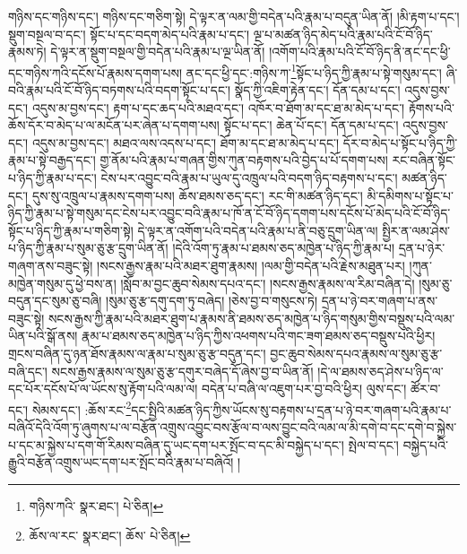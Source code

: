 གཉིས་དང་གཉིས་དང་། གཉིས་དང་གཅིག་སྟེ། དེ་ལྟར་ན་ལམ་གྱི་བདེན་པའི་རྣམ་པ་བདུན་ཡིན་ནོ། །མི་རྟག་པ་དང་། སྡུག་བསྔལ་བ་དང་། སྟོང་པ་དང་བདག་མེད་པའི་རྣམ་པ་དང་། ལྔ་པ་མཚན་ཉིད་མེད་པའི་རྣམ་པའི་ངོ་བོ་ཉིད་རྣམས་ཏེ། དེ་ལྟར་ན་སྡུག་བསྔལ་གྱི་བདེན་པའི་རྣམ་པ་ལྔ་ཡིན་ནོ། །འགོག་པའི་རྣམ་པའི་ངོ་བོ་ཉིད་ནི་ནང་དང་ཕྱི་དང་གཉིས་ཀའི་དངོས་པོ་རྣམས་དགག་པས། ནང་དང་ཕྱི་དང་:གཉིས་ཀ་\footnote{གཉིས་ཀའི་  སྣར་ཐང་།  པེ་ཅིན། }སྟོང་པ་ཉིད་ཀྱི་རྣམ་པ་སྟེ་གསུམ་དང་། ཞི་བའི་རྣམ་པའི་ངོ་བོ་ཉིད་བཏགས་པའི་བདག་སྟོང་པ་དང་། སྣོད་ཀྱི་འཇིག་རྟེན་དང་། དོན་དམ་པ་དང་། འདུས་བྱས་དང་། འདུས་མ་བྱས་དང་། རྟག་པ་དང་ཆད་པའི་མཐའ་དང་། འཁོར་བ་ཐོག་མ་དང་ཐ་མ་མེད་པ་དང་། རྟོགས་པའི་ཆོས་དོར་བ་མེད་པ་ལ་མངོན་པར་ཞེན་པ་དགག་པས། སྟོང་པ་དང་། ཆེན་པོ་དང་། དོན་དམ་པ་དང་། འདུས་བྱས་དང་། འདུས་མ་བྱས་དང་། མཐའ་ལས་འདས་པ་དང་། ཐོག་མ་དང་ཐ་མ་མེད་པ་དང་། དོར་བ་མེད་པ་སྟོང་པ་ཉིད་ཀྱི་རྣམ་པ་སྟེ་བརྒྱད་དང་། གྱ་ནོམ་པའི་རྣམ་པ་གཞན་གྱིས་ཀུན་བརྟགས་པའི་བྱེད་པ་པོ་དགག་པས། རང་བཞིན་སྟོང་པ་ཉིད་ཀྱི་རྣམ་པ་དང་། ངེས་པར་འབྱུང་བའི་རྣམ་པ་ཡུལ་དུ་འཁྲུལ་པའི་བདག་ཉིད་བརྟགས་པ་དང་། མཚན་ཉིད་དང་། དུས་སུ་འཁྲུལ་པ་རྣམས་དགག་པས། ཆོས་ཐམས་ཅད་དང་། རང་གི་མཚན་ཉིད་དང་། མི་དམིགས་པ་སྟོང་པ་ཉིད་ཀྱི་རྣམ་པ་སྟེ་གསུམ་དང་ངེས་པར་འབྱུང་བའི་རྣམ་པ་ཁོ་ན་ངོ་བོ་ཉིད་དགག་པས་དངོས་པོ་མེད་པའི་ངོ་བོ་ཉིད་སྟོང་པ་ཉིད་ཀྱི་རྣམ་པ་གཅིག་སྟེ། དེ་ལྟར་ན་འགོག་པའི་བདེན་པའི་རྣམ་པ་ནི་བཅུ་དྲུག་ཡིན་ལ། སྤྱིར་ན་ལམ་ཤེས་པ་ཉིད་ཀྱི་རྣམ་པ་སུམ་ཅུ་རྩ་དྲུག་ཡིན་ནོ། །དེའི་འོག་ཏུ་རྣམ་པ་ཐམས་ཅད་མཁྱེན་པ་ཉིད་ཀྱི་རྣམ་པ། དྲན་པ་ཉེར་གཞག་ནས་བཟུང་སྟེ། །སངས་རྒྱས་རྣམ་པའི་མཐར་ཐུག་རྣམས། །ལམ་གྱི་བདེན་པའི་རྗེས་མཐུན་པར། །ཀུན་མཁྱེན་གསུམ་དུ་ཕྱེ་བས་ན། །སློབ་མ་བྱང་ཆུབ་སེམས་དཔའ་དང་། །སངས་རྒྱས་རྣམས་ལ་རིམ་བཞིན་དེ། །སུམ་ཅུ་བདུན་དང་སུམ་ཅུ་བཞི། །སུམ་ཅུ་རྩ་དགུ་དག་ཏུ་བཞེད། །ཅེས་བྱ་བ་གསུངས་ཏེ། དྲན་པ་ཉེ་བར་གཞག་པ་ནས་བཟུང་སྟེ། སངས་རྒྱས་ཀྱི་རྣམ་པའི་མཐར་ཐུག་པ་རྣམས་ནི་ཐམས་ཅད་མཁྱེན་པ་ཉིད་གསུམ་གྱིས་བསྡུས་པའི་ལམ་ཡིན་པའི་སྒོ་ནས། རྣམ་པ་ཐམས་ཅད་མཁྱེན་པ་ཉིད་ཀྱིས་འཕགས་པའི་གང་ཟག་ཐམས་ཅད་བསྡུས་པའི་ཕྱིར། གྲངས་བཞིན་དུ་ཉན་ཐོས་རྣམས་ལ་རྣམ་པ་སུམ་ཅུ་རྩ་བདུན་དང་། བྱང་ཆུབ་སེམས་དཔའ་རྣམས་ལ་སུམ་ཅུ་རྩ་བཞི་དང་། སངས་རྒྱས་རྣམས་ལ་སུམ་ཅུ་རྩ་དགུར་བཞེད་དོ་ཞེས་བྱ་བ་ཡིན་ནོ། །དེ་ལ་ཐམས་ཅད་ཤེས་པ་ཉིད་ལ་དང་པོར་དངོས་པོ་ལ་ཡོངས་སུ་རྟོག་པའི་ལམ་ལ། བདེན་པ་བཞི་ལ་འཇུག་པར་བྱ་བའི་ཕྱིར། ལུས་དང་། ཚོར་བ་དང་། སེམས་དང་། :ཆོས་རང་\footnote{ཆོས་ལ་རང་  སྣར་ཐང་། ཆོས་  པེ་ཅིན། }དང་སྤྱིའི་མཚན་ཉིད་ཀྱིས་ཡོངས་སུ་བརྟགས་པ་དྲན་པ་ཉེ་བར་གཞག་པའི་རྣམ་པ་བཞིའོ་དེའི་འོག་ཏུ་ཞུགས་པ་ལ་བརྩོན་འགྲུས་འབྱུང་བས་རྩོལ་བ་ལས་བྱུང་བའི་ལམ་ལ་མི་དགེ་བ་དང་དགེ་བ་སྐྱེས་པ་དང་མ་སྐྱེས་པ་དག་གོ་རིམས་བཞིན་དུ་ཡང་དག་པར་སྤོང་བ་དང་མི་བསྐྱེད་པ་དང་། སྤེལ་བ་དང་། བསྐྱེད་པའི་རྒྱུའི་བརྩོན་འགྲུས་ཡང་དག་པར་སྤོང་བའི་རྣམ་པ་བཞིའོ། །
